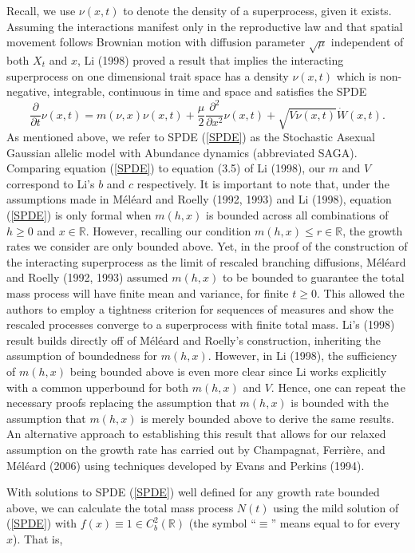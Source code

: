 \documentclass[]{article}
\begin{document}
Recall, we use \(\nu(x,t)\) to denote the density of a superprocess,
given it exists. Assuming the interactions manifest only in the
reproductive law and that spatial movement follows Brownian motion with
diffusion parameter \(\sqrt\mu\) independent of both \(X_t\) and \(x\),
Li (1998) proved a result that implies the interacting superprocess on
one dimensional trait space has a density \(\nu(x,t)\) which is
non-negative, integrable, continuous in time and space and satisfies the
SPDE \begin{equation}\label{SPDE}
\frac{\partial}{\partial t}\nu(x,t)=m(\nu,x)\nu(x,t)+\frac{\mu}{2}\frac{\partial^2}{\partial x^2}\nu(x,t)+\sqrt{V\nu(x,t)}\dot W(x,t).
\end{equation} As mentioned above, we refer to SPDE (\ref{SPDE}) as the
Stochastic Asexual Gaussian allelic model with Abundance dynamics
(abbreviated SAGA). Comparing equation (\ref{SPDE}) to equation (3.5) of
Li (1998), our \(m\) and \(V\) correspond to Li's \(b\) and \(c\)
respectively. It is important to note that, under the assumptions made
in Méléard and Roelly (1992, 1993) and Li (1998), equation (\ref{SPDE})
is only formal when \(m(h,x)\) is bounded across all combinations of
\(h\geq0\) and \(x\in\mathbb{R}\). However, recalling our condition
\(m(h,x)\leq r\in\mathbb{R}\), the growth rates we consider are only
bounded above. Yet, in the proof of the construction of the interacting
superprocess as the limit of rescaled branching diffusions, Méléard and
Roelly (1992, 1993) assumed \(m(h,x)\) to be bounded to guarantee the
total mass process will have finite mean and variance, for finite
\(t\geq0\). This allowed the authors to employ a tightness criterion for
sequences of measures and show the rescaled processes converge to a
superprocess with finite total mass. Li's (1998) result builds directly
off of Méléard and Roelly's construction, inheriting the assumption of
boundedness for \(m(h,x)\). However, in Li (1998), the sufficiency of
\(m(h,x)\) being bounded above is even more clear since Li works
explicitly with a common upperbound for both \(m(h,x)\) and \(V\).
Hence, one can repeat the necessary proofs replacing the assumption that
\(m(h,x)\) is bounded with the assumption that \(m(h,x)\) is merely
bounded above to derive the same results. An alternative approach to
establishing this result that allows for our relaxed assumption on the
growth rate has carried out by Champagnat, Ferrière, and Méléard (2006)
using techniques developed by Evans and Perkins (1994).

With solutions to SPDE (\ref{SPDE}) well defined for any growth rate
bounded above, we can calculate the total mass process \(N(t)\) using
the mild solution of (\ref{SPDE}) with
\(f(x)\equiv1\in C_b^2(\mathbb{R})\) (the symbol ``\(\equiv\)'' means
equal to for every \(x\)). That is,
\end{document}
